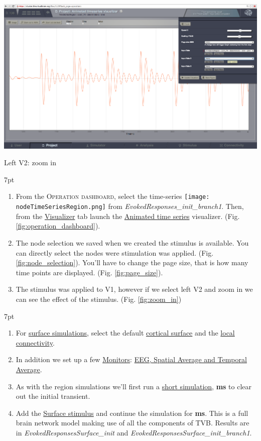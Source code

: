 \documentclass{tufte-handout}
\newenvironment{formal}{%
  \def\FrameCommand{%
    \hspace{1pt}%
    {\color{DarkBlue}\vrule width 2pt}%
    {\color{formalshade}\vrule width 4pt}%
    \colorbox{formalshade}%
  }%
  \MakeFramed{\advance\hsize-\width\FrameRestore}%
  \noindent\hspace{-4.55pt}%
  \begin{adjustwidth}{}{7pt}%
  \vspace{2pt}\vspace{2pt}%
}
{%
  \vspace{2pt}\end{adjustwidth}\endMakeFramed%
}
\newenvironment{simulation}{%
  \def\FrameCommand{%
    \hspace{1pt}%
    {\color{ForestGreen}\vrule width 2pt}%
    {\color{simulationshade}\vrule width 4pt}%
    \colorbox{simulationshade}%
  }%
  \MakeFramed{\advance\hsize-\width\FrameRestore}%
  \noindent\hspace{-4.55pt}%
  \begin{adjustwidth}{}{7pt}%
  \vspace{2pt}\vspace{2pt}%
}
{%
  \vspace{2pt}\end{adjustwidth}\endMakeFramed%
}
\begin{document}
\begin{marginfigure}
  \includegraphics[width=\linewidth]{Handout_UI_HeterogenousModelAndStimulation_ZoomIn}%
  \caption{Left V2: zoom in}%
  \label{fig:zoom_in}%
\end{marginfigure}
\begin{formal}
\begin{enumerate}
\item From the \textsc{Operation dashboard}, select  the time-series  \texttt{[image: nodeTimeSeriesRegion.png]} from \textit{EvokedResponses\_init\_branch1}. Then, from the \underline{Visualizer} tab launch the \underline{Animated time series} visualizer. (Fig. \ref{fig:operation_dashboard}).
\item The node selection we saved when we created the stimulus is available. You can directly select the nodes were stimulation was applied. (Fig. \ref{fig:node_selection}). 
You'll have to change the page size, that is how many time points are displayed. (Fig. \ref{fig:page_size}).
\item The stimulus was applied to V1, however if we select left V2 and zoom in we can see the effect of the stimulus. (Fig. \ref{fig:zoom_in})
\end{enumerate}
\end{formal}

\begin{simulation}
\begin{enumerate}
\item For \underline{surface simulations}, select the default \underline{cortical surface} and the \underline{local connectivity}.
\item In addition we set up a few \underline{Monitors}: \underline{EEG, Spatial Average and Temporal Average}.
\item As with the region simulations we'll first run a \underline{short simulation}, \textbf{\unit[200]{ms}} to clear out the initial transient.
\item Add the \underline{Surface stimulus} and continue the simulation for \textbf{\unit[4000]{ms}}. This is a full brain network model making use of all the components of TVB. Results are in \textit{EvokedResponsesSurface\_init} and \textit{EvokedResponsesSurface\_init\_branch1}.
\end{enumerate}
\end{simulation}
\end{document}
